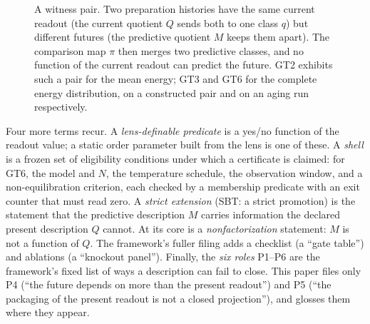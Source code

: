 \begin{figure}[htbp]
  \centering
  \caption{A witness pair. Two preparation histories have the same current readout (the
    current quotient $Q$ sends both to one class $q$) but different futures (the predictive
    quotient $M$ keeps them apart). The comparison map $\pi$ then merges two predictive classes,
    and no function of the current readout can predict the future. GT2 exhibits such a pair for the
    mean energy; GT3 and GT6 for the complete energy distribution, on a constructed pair and on
    an aging run respectively.}
  \label{fig:witness-concept}
\end{figure}

Four more terms recur. A \emph{lens-definable predicate} is a yes/no function of the readout
value; a static order parameter built from the lens is one of these. A \emph{shell} is a frozen
set of eligibility conditions under which a certificate is claimed: for GT6, the model and $N$,
the temperature schedule, the observation window, and a non-equilibration criterion, each checked
by a membership predicate with an exit counter that must read zero. A \emph{strict extension}
(SBT: a strict promotion) is the statement that the predictive description $M$ carries
information the declared present description $Q$ cannot. At its core is a
\emph{nonfactorization} statement: $M$ is not a function of $Q$. The framework's fuller filing
adds a checklist (a ``gate table'') and ablations (a ``knockout panel''). Finally, the \emph{six
roles} P1--P6 are the framework's fixed list of ways a description can fail to close. This paper
files only P4 (``the future depends on more than the present readout'') and P5 (``the packaging
of the present readout is not a closed projection''), and glosses them where they appear.

